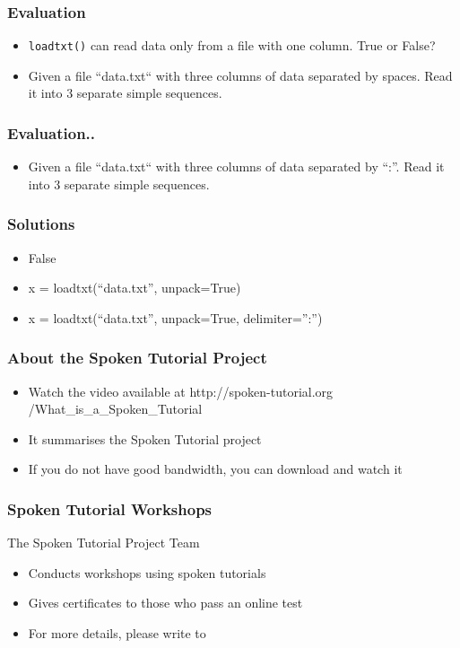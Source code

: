 \documentclass[17pt]{beamer}
\begin{document}
\begin{frame}
  \frametitle{Evaluation}
    \begin{itemize}
     \item \verb~loadtxt()~ can read data only from a file with one column.
     True or False?
     \item Given a file ``data.txt`` with three columns of data separated by spaces. Read it into 3 separate simple sequences.
    \end{itemize}
\end{frame}

\begin{frame}[fragile]
  \frametitle{Evaluation..}
  \begin{itemize}
  \item Given a file ``data.txt`` with three columns of data separated by ``:''. Read it into 3 separate simple sequences.
  \end{itemize}
\end{frame}
\begin{frame}
  \frametitle{Solutions}
    \begin{itemize}
    \item False
    \item x = loadtxt(``data.txt'', unpack=True)
    \item x = loadtxt(``data.txt'', unpack=True, delimiter='':'')
  \end{itemize} 
\end{frame}
\begin{frame}
\frametitle{About the Spoken Tutorial Project}
\begin{itemize}
\item Watch the video available at {\color{blue}http://spoken-tutorial.org /What\_is\_a\_Spoken\_Tutorial}
\item It summarises the Spoken Tutorial project \pause
\item If you do not have good bandwidth, you can download and watch it
\end{itemize}
\end{frame}
\begin{frame}
\frametitle{Spoken Tutorial Workshops}The Spoken Tutorial Project Team 
\begin{itemize}
\item Conducts workshops using spoken tutorials 
\item Gives certificates to those who pass an online test 
\item For more details, please write to \\ 
\end{itemize}
\end{frame}
\end{document}
